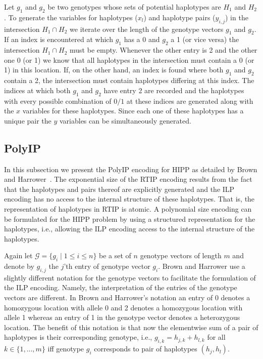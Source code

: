 \documentclass[12pt,a4paper]{article}
\begin{document}
Let $g_1$ and $g_2$ be two genotypes whose sets of potential haplotypes are $H_1$ and $H_2$.
To generate the variables for haplotypes ($x_l$) and haplotype pairs ($y_{i,j}$) in the intersection $H_1\cap H_2$ we iterate over the length of the genotype vectors $g_1$ and $g_2$.
If an index is encountered at which $g_1$ has a 0 and $g_2$ a 1 (or vice versa) the intersection $H_1\cap H_2$ must be empty.
Whenever the other entry is 2 and the other one 0 (or 1) we know that all haplotypes in the intersection must contain a 0 (or 1) in this location.
If, on the other hand, an index is found where both $g_1$ and $g_2$ contain a 2, the intersection must contain haplotypes differing at this index.
The indices at which both $g_1$ and $g_2$ have entry 2 are recorded and the haplotypes with every possible combination of $0/1$ at these indices are generated along with the $x$ variables for these haplotypes.
Since each one of these haplotypes has a unique pair the $y$ variables can be simultaneously generated.

\subsection{PolyIP}
In this subsection we present the PolyIP encoding for HIPP as detailed by Brown and Harrower~\cite{DBLP:journals/tcbb/BrownH06}.
The exponential size of the RTIP encoding results from the fact that the haplotypes and pairs thereof are explicitly generated and the ILP encoding has no access to the internal structure of these haplotypes.
That is, the representation of haplotypes in RTIP is atomic.
A polynomial size encoding can be formulated for the HIPP problem by using a structured representation for the haplotypes, i.e., allowing the ILP encoding access to the internal structure of the haplotypes.

Again let $\mathcal{G}=\{g_i\mid 1\leq i \leq n\}$ be a set of $n$ genotype vectors of length $m$ and denote by $g_{i,j}$ the $j$'th entry of genotype vector $g_i$.
Brown and Harrower use a slightly different notation for the genotype vectors to facilitate the formulation of the ILP encoding.
Namely, the interpretation of the entries of the genotype vectors are different.
In Brown and Harrower's notation an entry of 0 denotes a homozygous location with allele 0 and 2 denotes a homozygous location with allele 1 whereas 
an entry of 1 in the genotype vector denotes a heterozygous location.
The benefit of this notation is that now the elementwise sum of a pair of haplotypes is their corresponding genotype, i.e., $g_{i,k} = h_{j, k} + h_{l, k}$ for all $k\in\{1,\dots ,m\}$ iff genotype $g_i$ corresponds to pair of haplotypes $(h_{j}, h_{l})$.
\end{document}
